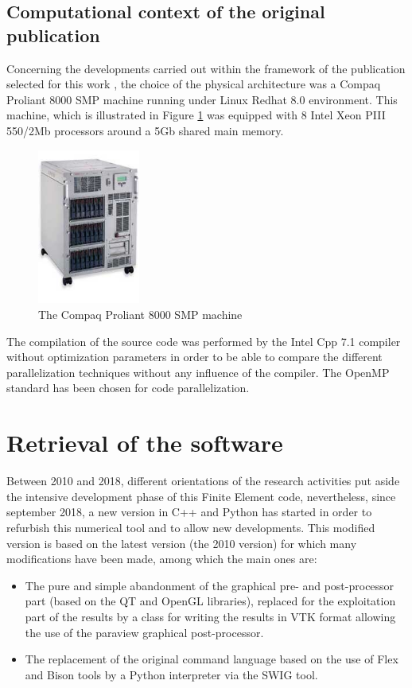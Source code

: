 \documentclass{article}
\begin{document}
\subsection{Computational context of the original publication}
Concerning the developments carried out within the framework of the publication selected for this work \cite{Pantale:2005}, the choice of the physical architecture was a Compaq Proliant 8000 SMP machine running under Linux Redhat 8.0 environment. This machine, which is illustrated in Figure \ref{proliant} was equipped with 8 Intel Xeon PIII 550/2Mb processors around a 5Gb shared main memory. 
\begin{figure}[h] 
  \centering
  \includegraphics[width=0.3\textwidth]{./8000_photo.jpg}
  \caption{The Compaq Proliant 8000 SMP machine}
  \label{proliant}
\end{figure}
The compilation of the source code was performed by the Intel Cpp 7.1 compiler without optimization parameters in order to be able to compare the different parallelization techniques without any influence of the compiler. The OpenMP standard has been chosen for code parallelization.

\section{Retrieval of the software}

Between 2010 and 2018, different orientations of the research activities put aside the intensive development phase of this Finite Element code, nevertheless, since september 2018, a new version in C++ and Python has started in order to refurbish this numerical tool and to allow new developments. This modified version is based on the latest version (the 2010 version) for which many modifications have been made, among which the main ones are:
\begin{itemize}
\item The pure and simple abandonment of the graphical pre- and post-processor part (based on the QT and OpenGL libraries), replaced for the exploitation part of the results by a class for writing the results in VTK format allowing the use of the paraview graphical post-processor.
\item The replacement of the original command language based on the use of Flex and Bison tools by a Python interpreter via the SWIG tool.
\end{itemize}
\end{document}
